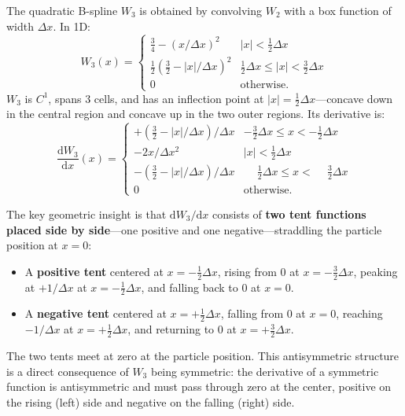 \documentclass[11pt,a4paper]{article}
\newcommand{\dd}{\mathrm{d}}
\begin{document}
The quadratic B-spline $W_3$ is obtained by convolving $W_2$ with a box function of width $\Delta x$.  In 1D:
\begin{equation}
  W_3(x) = \begin{cases}
    \tfrac{3}{4} - (x/\Delta x)^2                             & |x| < \tfrac{1}{2}\Delta x \\
    \tfrac{1}{2}\!\left(\tfrac{3}{2} - |x|/\Delta x\right)^2 & \tfrac{1}{2}\Delta x \leq |x| < \tfrac{3}{2}\Delta x \\
    0                                                          & \text{otherwise.}
  \end{cases}
\end{equation}
$W_3$ is $C^1$, spans 3 cells, and has an inflection point at $|x|=\tfrac{1}{2}\Delta x$---concave down in the central region and concave up in the two outer regions.  Its derivative is:
\begin{equation}
\label{eq:dW3}
  \frac{\dd W_3}{\dd x}(x) = \begin{cases}
    +\!\left(\tfrac{3}{2} - |x|/\Delta x\right)/\Delta x & -\tfrac{3}{2}\Delta x \leq x < -\tfrac{1}{2}\Delta x \\
    -2x/\Delta x^2                                        & |x| < \tfrac{1}{2}\Delta x \\
    -\!\left(\tfrac{3}{2} - |x|/\Delta x\right)/\Delta x & \phantom{-}\tfrac{1}{2}\Delta x \leq x < \phantom{-}\tfrac{3}{2}\Delta x \\
    0                                                     & \text{otherwise.}
  \end{cases}
\end{equation}

The key geometric insight is that $\dd W_3/\dd x$ consists of \textbf{two tent functions placed side by side}---one positive and one negative---straddling the particle position at $x=0$:
\begin{itemize}
  \item A \textbf{positive tent} centered at $x=-\tfrac{1}{2}\Delta x$, rising from 0 at $x=-\tfrac{3}{2}\Delta x$, peaking at $+1/\Delta x$ at $x=-\tfrac{1}{2}\Delta x$, and falling back to 0 at $x=0$.
  \item A \textbf{negative tent} centered at $x=+\tfrac{1}{2}\Delta x$, falling from 0 at $x=0$, reaching $-1/\Delta x$ at $x=+\tfrac{1}{2}\Delta x$, and returning to 0 at $x=+\tfrac{3}{2}\Delta x$.
\end{itemize}
The two tents meet at zero at the particle position.  This antisymmetric structure is a direct consequence of $W_3$ being symmetric: the derivative of a symmetric function is antisymmetric and must pass through zero at the center, positive on the rising (left) side and negative on the falling (right) side.
\end{document}
